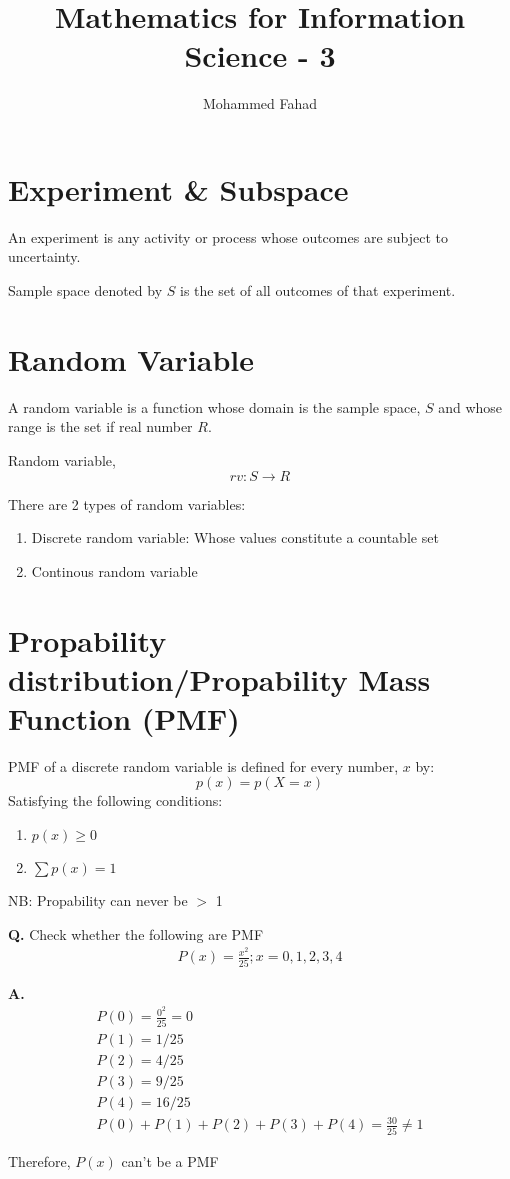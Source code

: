 \documentclass{article}
\title{Mathematics for Information Science - 3}
\author{Mohammed Fahad}
\begin{document}
\maketitle

\section{Experiment \& Subspace}
An experiment is any activity or process whose outcomes are subject to uncertainty.

Sample space denoted by $S$ is the set of all outcomes of that experiment.

\section{Random Variable}
A random variable is a function whose domain is the sample space, $S$ and whose range is the set if real number $R$.

Random variable, 
\[
rv: S \rightarrow R
\]

There are 2 types of random variables:
\begin{enumerate}
    \item Discrete random variable: Whose values constitute a countable set
    \item Continous random variable
\end{enumerate}

\section{Propability distribution/Propability Mass Function (PMF)}
PMF of a discrete random variable is defined for every number, $x$ by:
\[
p(x) = p(X = x)
\]
Satisfying the following conditions:
\begin{enumerate}
    \item \( p(x) \geq 0 \)
    \item \( \sum p(x) = 1 \)
\end{enumerate}

NB: Propability can never be $>$ 1


\textbf{Q.} Check whether the following are PMF
\begin{align*}
    P(x) = \frac{x^2}{25}; x = 0, 1, 2, 3, 4
\end{align*}

\textbf{A.} 
\begin{align*}
    P(0) = \frac{0^2}{25} = 0 \\
    P(1) = 1/25 \\
    P(2) = 4/25 \\
    P(3) = 9/25 \\
    P(4) = 16/25 \\
    P(0) + P(1) + P(2) + P(3) + P(4) = \frac{30}{25} \neq 1 
\end{align*}

Therefore, $P(x)$ can't be a PMF
\end{document}
